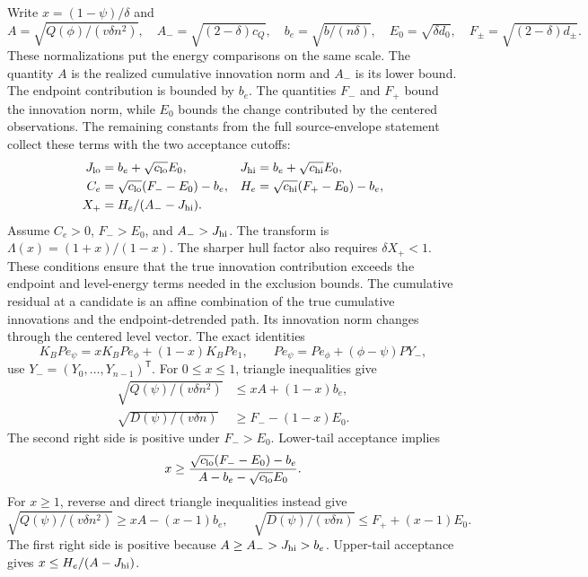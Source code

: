 Write $x=(1-\psi)/\delta$ and
\[
 A=\sqrt{Q(\phi)/(v\delta n^2)},\quad
 A_-=\sqrt{(2-\delta)c_Q},\quad b_e=\sqrt{b/(n\delta)},\quad
 E_0=\sqrt{\delta d_0},\quad F_\pm=\sqrt{(2-\delta)d_\pm}.
\]
These normalizations put the energy comparisons on the same scale. The quantity $A$ is the realized cumulative innovation norm and $A_-$ is its lower bound. The endpoint contribution is bounded by $b_e$. The quantities $F_-$ and $F_+$ bound the innovation norm, while $E_0$ bounds the change contributed by the centered observations. The remaining constants from the full source-envelope statement collect these terms with the two acceptance cutoffs:
\[
\begin{aligned}
 J_{\rm lo}&=b_e+\sqrt{c_{\rm lo}}E_0,&
 J_{\rm hi}&=b_e+\sqrt{c_{\rm hi}}E_0,\\
 C_e&=\sqrt{c_{\rm lo}}(F_--E_0)-b_e,&
 H_e&=\sqrt{c_{\rm hi}}(F_+-E_0)-b_e,\\
 X_+&=H_e/(A_--J_{\rm hi}).
\end{aligned}
\]
Assume $C_e>0$, $F_->E_0$, and $A_->J_{\rm hi}$. The transform is $\Lambda(x)=(1+x)/(1-x)$. The sharper hull factor also requires $\delta X_+<1$. These conditions ensure that the true innovation contribution exceeds the endpoint and level-energy terms needed in the exclusion bounds. The cumulative residual at a candidate is an affine combination of the true cumulative innovations and the endpoint-detrended path. Its innovation norm changes through the centered level vector. The exact identities
\begin{equation}\label{src16:si-affine}
 K_BPe_\psi=xK_BPe_\phi+(1-x)K_BPe_1,
 \qquad Pe_\psi=Pe_\phi+(\phi-\psi)P Y_-,
\end{equation}
use $Y_-=(Y_0,\ldots,Y_{n-1})^{\mathsf T}$. For $0\le x\le1$, triangle inequalities give
\begin{align*}
 \sqrt{Q(\psi)/(v\delta n^2)}&\le xA+(1-x)b_e,\\
 \sqrt{D(\psi)/(v\delta n)}&\ge F_--(1-x)E_0.
\end{align*}
The second right side is positive under $F_->E_0$. Lower-tail acceptance implies
\[
 x\ge\frac{\sqrt{c_{\rm lo}}(F_--E_0)-b_e}
 {A-b_e-\sqrt{c_{\rm lo}}E_0}.
\]
For $x\ge1$, reverse and direct triangle inequalities instead give
\[
 \sqrt{Q(\psi)/(v\delta n^2)}\ge xA-(x-1)b_e,
 \qquad \sqrt{D(\psi)/(v\delta n)}\le F_++(x-1)E_0.
\]
The first right side is positive because $A\ge A_->J_{\rm hi}>b_e$. Upper-tail acceptance gives $x\le H_e/(A-J_{\rm hi})$.

